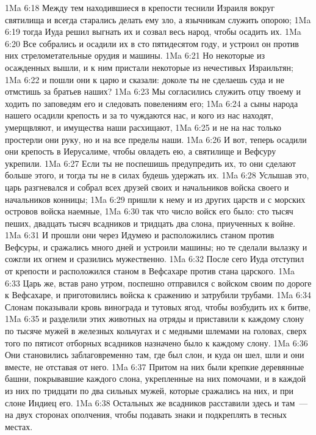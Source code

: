 \vs 1Ma 6:18 Между тем находившиеся в крепости теснили Израиля вокруг святилища и всегда старались делать ему зло, а язычникам служить опорою;
\vs 1Ma 6:19 тогда Иуда решил выгнать их и созвал весь народ, чтобы осадить их.
\vs 1Ma 6:20 Все собрались и осадили их в сто пятидесятом году, и устроил он против них стрелометательные орудия и машины.
\vs 1Ma 6:21 Но некоторые из осажденных вышли, и к ним пристали некоторые из нечестивых Израильтян;
\vs 1Ma 6:22 и пошли они к царю и сказали: доколе ты не сделаешь суда и не отмстишь за братьев наших?
\vs 1Ma 6:23 Мы согласились служить отцу твоему и ходить по заповедям его и следовать повелениям его;
\vs 1Ma 6:24 а сыны народа нашего осадили крепость и за то чуждаются нас, и кого из нас находят, умерщвляют, и имущества наши расхищают,
\vs 1Ma 6:25 и не на нас только простерли они руку, но и на все пределы наши.
\vs 1Ma 6:26 И вот, теперь осадили они крепость в Иерусалиме, чтобы овладеть ею, а святилище и Вефсуру укрепили.
\vs 1Ma 6:27 Если ты не поспешишь предупредить их, то они сделают больше этого, и тогда ты не в силах будешь удержать их.
\vs 1Ma 6:28 Услышав это, царь разгневался и собрал всех друзей своих и начальников войска своего и начальников конницы;
\vs 1Ma 6:29 пришли к нему и из других царств и с морских островов войска наемные,
\vs 1Ma 6:30 так что число войск его было: сто тысяч пеших, двадцать тысяч всадников и тридцать два слона, приученных к войне.
\vs 1Ma 6:31 И прошли они через Идумею и расположились станом против Вефсуры, и сражались много дней и устроили машины; но те сделали вылазку и сожгли их огнем и сразились мужественно.
\vs 1Ma 6:32 После сего Иуда отступил от крепости и расположился станом в Вефсахаре против стана царского.
\vs 1Ma 6:33 Царь же, встав рано утром, поспешно отправился с войском своим по дороге к Вефсахаре, и приготовились войска к сражению и затрубили трубами.
\vs 1Ma 6:34 Слонам показывали кровь винограда и тутовых ягод, чтобы возбудить их к битве,
\vs 1Ma 6:35 и разделили этих животных на отряды и приставили к каждому слону по тысяче мужей в железных кольчугах и с медными шлемами на головах, сверх того по пятисот отборных всадников назначено было к каждому слону.
\vs 1Ma 6:36 Они становились заблаговременно там, где был слон, и куда он шел, шли и они вместе, не отставая от него.
\vs 1Ma 6:37 Притом на них были крепкие деревянные башни, покрывавшие каждого слона, укрепленные на них помочами, и в каждой из них по тридцати по два сильных мужей, которые сражались на них, и при слоне Индиец его.
\vs 1Ma 6:38 Остальных же всадников расставили здесь и там~--- на двух сторонах ополчения, чтобы подавать знаки и подкреплять в тесных местах.
